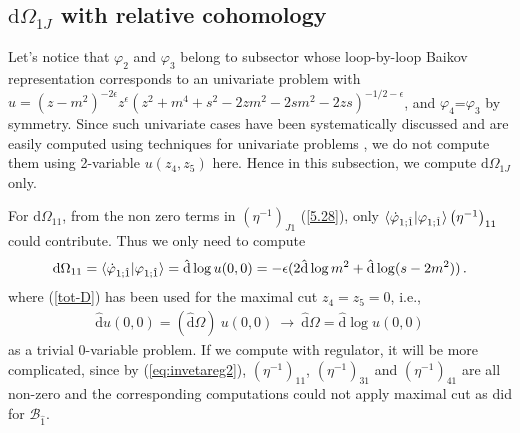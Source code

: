 \documentclass[a4paper,11pt]{article}
\newcommand{\nd}{\mathrm{d}}
\newcommand{\nds}{\hat{\mathrm{d}}}
\newcommand{\ep}{\epsilon}
\def\eref#1{(\ref{#1})}
\begin{document}

\subsection{$\nd \Omega_{1J}$ with relative cohomology}

Let's notice that $\varphi_2$ and $\varphi_3$ belong to subsector whose loop-by-loop Baikov representation corresponds to an univariate problem with $u=(z-m^2)^{-2\ep}z^{\ep}(z^2+m^4+s^2-2zm^2-2sm^2-2zs)^{-1/2-\ep}$, and $\varphi_4$=$\varphi_3$ by symmetry. Since such univariate cases have been systematically discussed and are easily computed using techniques  for univariate problems \cite{Chen:2023kgw}, we do not compute them using 2-variable $u(z_4,z_5)$ here. Hence in this subsection, we compute $\nd \Omega_{1J}$ only. 

For $\nd \Omega_{11}$, from the non zero terms in $\left(\eta^{-1}\right)_{J1}$ \eref{5.28},  only $\braket{\dot{\varphi}_{1;\hat{1}}|\varphi_{1;\hat{1}}}\left(\eta^{-1}\right)_{11}$ could contribute. Thus we only need to compute
\begin{align} 
\nd \Omega_{11} = \braket{\dot{\varphi}_{1;\hat{1}}|\varphi_{1;\hat{1}}} = \nds \log u(0,0) =-\ep  (2\nds \log m^2 + \nds \log (s-2m^2) )  \,. \label{eq:d11}
\end{align}
where \eref{tot-D} has been used for the maximal cut $z_4=z_5=0$, i.e.,
\begin{align}
\nds u(0,0) = (\nds \Omega)~  u(0,0) \ \to \  \nds \Omega = \nds \log u(0,0)
\end{align}
as a trivial 0-variable problem. If we compute with regulator, it will be more complicated,  since by \eref{eq:invetareg2}, $\left(\eta^{-1}\right)_{11}$, $\left(\eta^{-1}\right)_{31}$ and $\left(\eta^{-1}\right)_{41}$ are all non-zero and the corresponding computations could not apply maximal cut as did for $\mathcal{B}_{\hat{1}}$. 
\end{document}
